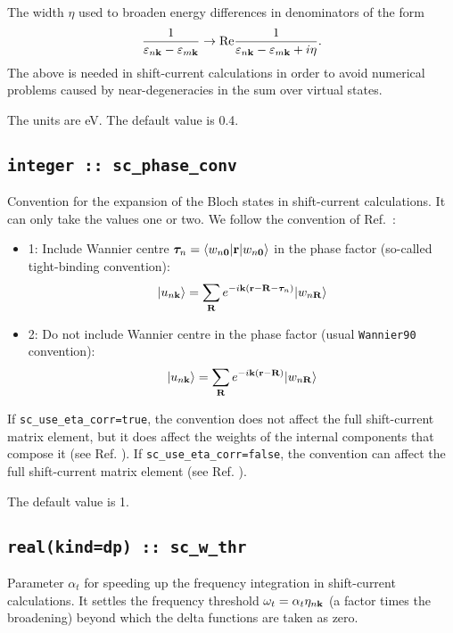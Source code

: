 The width $\eta$ used to broaden energy differences in denominators of the form 
%
$$
\frac{1}{\varepsilon_{n\bf{k}}-\varepsilon_{m\bf{k}}}\rightarrow
\text{Re}\frac{1}{\varepsilon_{n\bf{k}}-\varepsilon_{m\bf{k}}+i\eta}.
$$ 
%
The above is needed in shift-current calculations in order to avoid numerical problems
caused by near-degeneracies in the sum over virtual states. 

The units are eV. The default value is 0.4.


\subsection{\tt integer :: sc\_phase\_conv}

Convention for the expansion of the Bloch states in shift-current calculations. It can only take the values one or two.
We follow the convention of Ref.~\cite{pythtb}:
\begin{itemize}

\item
  1: Include Wannier centre ${\bm \tau}_{n}=\langle w_{n{\bf 0}}|{\bf r}| w_{n{\bf 0}} \rangle$ in the phase factor
  (so-called tight-binding convention):
%
$$
|u_{n\bf{k}}\rangle = \sum_{\bf{R}} e^{-i{\bf k}({\bf r}-{\bf R}-{\bm \tau}_{n})}| w_{n\bf{R}} \rangle
$$ 
%

\item
  2: Do not include Wannier centre in the phase factor (usual \verb|Wannier90| convention):
%
$$
|u_{n\bf{k}}\rangle = \sum_{\bf{R}} e^{-i\bf{k}(\bf{r}-\bf{R})}| w_{n\bf{R}} \rangle
$$ 
%
\end{itemize}
If {\tt sc\_use\_eta\_corr=true}, the convention does not affect the full shift-current matrix element, but it does affect
the weights of the internal components that compose it (see Ref. \cite{ibanez-azpiroz_ab_2018}).
If {\tt sc\_use\_eta\_corr=false}, the convention can affect the full shift-current matrix element (see Ref. \cite{Lihm_shift_eta_2021}).

The default value is 1. 


\subsection{\tt real(kind=dp)  :: sc\_w\_thr}

Parameter $\alpha_{t}$ for speeding up the frequency integration in shift-current calculations.
It settles the frequency threshold $\omega_{t}=\alpha_{t}\eta_{n{\bf k}}$
(a factor times the broadening)
beyond which the delta functions are taken as zero. 


